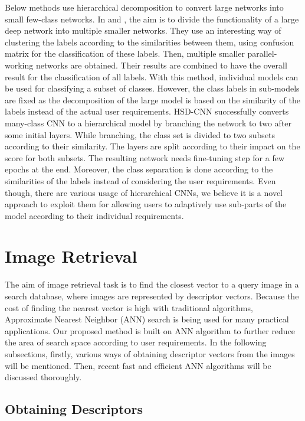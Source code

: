Below methods use hierarchical decomposition to convert large networks into small few-class networks.
In \cite{chennupati2016hierarchical} and \cite{nooka2016adaptive}, the aim is to divide the functionality of a large deep network into multiple smaller networks. 
They use an interesting way of clustering the labels according to the similarities between them, using confusion matrix for the classification of these labels.
Then, multiple smaller parallel-working networks are obtained. 
Their results are combined to have the overall result for the classification of all labels.
With this method, individual models can be used for classifying a subset of classes.
However, the class labels in sub-models are fixed as the decomposition of the large model is based on the similarity of the labels instead of the actual user requirements.
HSD-CNN\cite{sairam2018hsd} successfully converts many-class CNN to a hierarchical model by branching the network to two after some initial layers.
While branching, the class set is divided to two subsets according to their similarity.
The layers are split according to their impact on the score for both subsets.
The resulting network needs fine-tuning step for a few epochs at the end. 
Moreover, the class separation is done according to the similarities of the labels instead of considering the user requirements.
Even though, there are various usage of hierarchical CNNs, we believe it is a novel approach to exploit them for allowing users to adaptively use sub-parts of the model according to their individual requirements.


\section{Image Retrieval}

The aim of image retrieval task is to find the closest vector to a query image in a search database, where images are represented by descriptor vectors.
Because the cost of finding the nearest vector is high with traditional algorithms, Approximate Nearest Neighbor (ANN) search is being used for many practical applications.
Our proposed method is built on ANN algorithm to further reduce the area of search space according to user requirements. 
In the following subsections, firstly, various ways of obtaining descriptor vectors from the images will be mentioned. 
Then, recent fast and efficient ANN algorithms will be discussed thoroughly. 

\subsection{Obtaining Descriptors}

